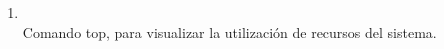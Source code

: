 \documentclass[11pt]{article}
\begin{document}
\begin{enumerate}
		    \item 
		    	\begin{minipage}[t]{\linewidth}
			        \raggedright
			        \medskip
			        \\Comando top, para visualizar la utilización de recursos del sistema. 
		        \end{minipage}
		\end{enumerate}
\end{document}
